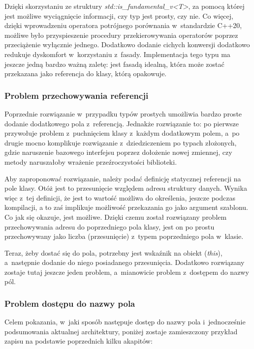 \documentclass[12pt]{article}
\newcommand{\n}{\newline}
\newcommand{\code}[1]{{\it #1}}
\begin{document}
{{{				Dzięki skorzystaniu ze struktury \code{std::is\_fundamental\_v<T>}\cite{std_is_fundamental}, za pomocą której jest możliwe wyciągnięcie informacji,
				czy typ jest prosty, czy nie. Co więcej, dzięki wprowadzeniu operatora potrójnego porównania \cite{starship_operator} w~standardzie C++20, możliwe było
				przyspieszenie procedury przekierowywania operatorów poprzez przeciążenie wyłącznie jednego. Dodatkowo dodanie cichych konwersji dodatkowo redukuje
				dyskomfort w~korzystaniu z~fasady. Implementacja tego typu ma jeszcze jedną bardzo ważną zaletę: jest fasadą idealną, która może zostać przekazana jako referencja
				do klasy, którą opakowuje.
			}

			{
				\subsubsection{Problem przechowywania referencji}

				Poprzednie rozwiązanie w~przypadku typów prostych umożliwia bardzo proste dodanie dodatkowego pola z~referencją. Jednakże rozwiązanie to:
				po pierwsze przywołuje problem z~puchnięciem klasy z~każdym dodatkowym polem, a~po drugie mocno komplikuje rozwiązanie z~dziedziczeniem po
				typach złożonych, gdzie naruszenie bazowego interfejsu poprzez dołożenie nowej zmiennej, czy metody naruszałoby wrażenie przeźroczystości
				biblioteki.\n

				Aby zaproponować rozwiązanie, należy podać definicję statycznej referencji na pole klasy. Otóż jest to przesunięcie względem
				adresu struktury danych. Wynika więc z~tej definicji, że jest to wartość możliwa do określenia, jeszcze podczas kompilacji,
				a to zaś implikuje możliwość przekazania go jako argument szablonu. Co jak się okazuje, jest możliwe. Dzięki czemu został rozwiązany problem
				przechowywania adresu do poprzedniego pola klasy, jest on po prostu przechowywany jako liczba (przesunięcie) z~typem poprzedniego pola w~klasie.\n

				Teraz, żeby dostać się do pola, potrzebny jest wskaźnik na obiekt (\code{this}), a~następnie dodanie do niego posiadanego przesunięcia.
				Dodatkowo rozwiązany zostaje tutaj jeszcze jeden problem, a~mianowicie problem z~dostępem do nazwy pól.
			}

			{
				\subsubsection{Problem dostępu do nazwy pola}

				Celem pokazania, w~jaki sposób następuje dostęp do nazwy pola i~jednocześnie podsumowania aktualnej architektury, poniżej zostaje zamieszczony
				przykład zapisu na podstawie poprzednich kilku akapitów:\n

}}}
\end{document}
